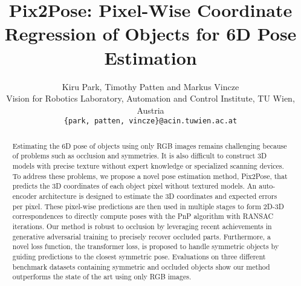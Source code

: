 \documentclass[10pt,twocolumn,letterpaper]{article}
\begin{document}
\title{Pix2Pose: Pixel-Wise Coordinate Regression of Objects for 6D Pose Estimation}


\author{Kiru Park, Timothy Patten and Markus Vincze
\\
Vision for Robotics Laboratory, Automation and Control Institute, TU Wien, Austria\\
{\tt\small \{park, patten, vincze\}@acin.tuwien.ac.at}
}

\maketitle

\ificcvfinal\thispagestyle{empty}\fi

\makeatletter
\renewcommand{\paragraph}{\@startsection{paragraph}{4}{\z@}{1.0ex \@plus 0.5ex \@minus .5ex}{-1em}{\normalfont\normalsize\bfseries}}
\newcommand\blfootnote[1]{\begingroup
  \renewcommand\thefootnote{}\footnote{#1}\addtocounter{footnote}{-1}\endgroup
}

\makeatother

\begin{abstract}
Estimating the 6D pose of objects using only RGB images remains challenging because of problems such as occlusion and symmetries. It is also difficult to construct 3D models with precise texture without expert knowledge or specialized scanning devices. To address these problems, we propose a novel pose estimation method, Pix2Pose, that predicts the 3D coordinates of each object pixel without textured models. An auto-encoder architecture is designed to estimate the 3D coordinates and expected errors per pixel. These pixel-wise predictions are then used in multiple stages to form 2D-3D correspondences to directly compute poses with the PnP algorithm with RANSAC iterations. Our method is robust to occlusion by leveraging recent achievements in generative adversarial training to precisely recover occluded parts. Furthermore, a novel loss function, the transformer loss, is proposed to handle symmetric objects by guiding predictions to the closest symmetric pose. Evaluations on three different benchmark datasets containing symmetric and occluded objects show our method outperforms the state of the art using only RGB images.
\end{abstract}
\end{document}
